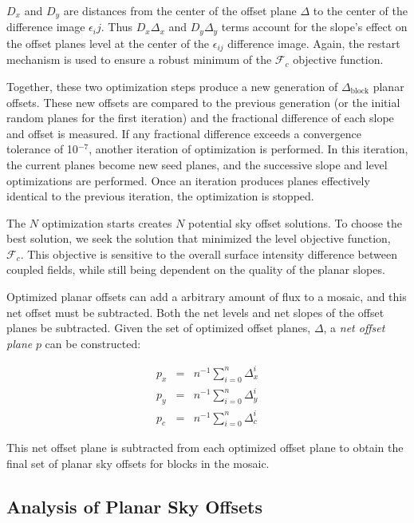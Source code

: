 \documentclass[iop]{emulateapj}
\begin{document}
$D_x$ and $D_y$ are distances from the center of the offset plane $\Delta$ to the center of the difference image $\epsilon_ij$. Thus $D_x\Delta_x$ and $D_y\Delta_y$ terms account for the slope's effect on the offset planes level at the center of the $\epsilon_{ij}$ difference image. Again, the restart mechanism is used to ensure a robust minimum of the $\mathcal{F}_c$ objective function.

Together, these two optimization steps produce a new generation of $\Delta_\mathrm{block}$ planar offsets. These new offsets are compared to the previous generation (or the initial random planes for the first iteration) and the fractional difference of each slope and offset is measured. If any fractional difference exceeds a convergence tolerance of 10$^{-7}$, another iteration of optimization is performed. In this iteration, the current planes become new seed planes, and the successive slope and level optimizations are performed. Once an iteration produces planes effectively identical to the previous iteration, the optimization is stopped.

The $N$ optimization starts creates $N$ potential sky offset solutions. To choose the best solution, we seek the solution that minimized the level objective function, $\mathcal{F}_c$. This objective is sensitive to the overall surface intensity difference between coupled fields, while still being dependent on the quality of the planar slopes.

Optimized planar offsets can add a arbitrary amount of flux to a mosaic, and this net offset must be subtracted. Both the net levels and net slopes of the offset planes be subtracted. Given the set of optimized offset planes, $\Delta$, a \emph{net offset plane} $p$ can be constructed:

\begin{eqnarray}
	p_x & = & n^{-1} \sum_{i=0}^n \Delta_x^i \\
	p_y & = & n^{-1} \sum_{i=0}^n \Delta_y^i \\
	p_c & = & n^{-1} \sum_{i=0}^n \Delta_c^i
\end{eqnarray}

\noindent This net offset plane is subtracted from each optimized offset plane to obtain the final set of planar sky offsets for blocks in the mosaic.

\subsection{Analysis of Planar Sky Offsets}
\end{document}
